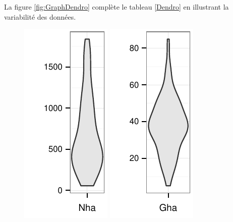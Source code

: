 \documentclass[a4paper]{book}\usepackage[]{graphicx}\usepackage[]{color}
\makeatletter
\def\maxwidth{ %
  \ifdim\Gin@nat@width>\linewidth
    \linewidth
  \else
    \Gin@nat@width
  \fi
}
\newenvironment{knitrout}{}{} %
\makeatother
\begin{document}
La figure \ref{fig:GraphDendro} complète le tableau \ref{Dendro} en illustrant la variabilité des données. \\
\begin{knitrout}\footnotesize
{}\color{fgcolor}\begin{figure}[H]


{\centering \includegraphics[width=\maxwidth]{Figures/GraphDendro-1} 
\includegraphics[width=\maxwidth]{Figures/GraphDendro-2} 
}
\end{figure}
\end{knitrout}
\end{document}
